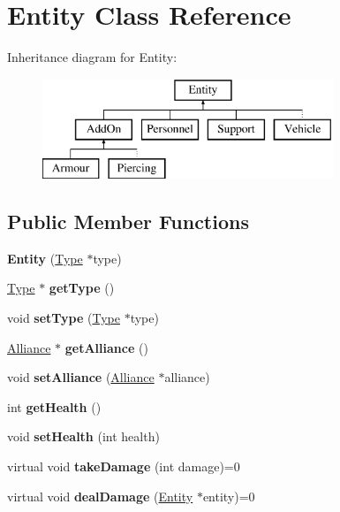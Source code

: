 \hypertarget{classEntity}{}\section{Entity Class Reference}
\label{classEntity}
Inheritance diagram for Entity\+:\begin{figure}[H]
\begin{center}
\leavevmode
\includegraphics[height=3.000000cm]{classEntity}
\end{center}
\end{figure}
\subsection*{Public Member Functions}
\begin{DoxyCompactItemize}
\item 
\mbox{\label{classEntity_aec265b299e5f6ba10ed4e38f2d206ad7}} 
{\bfseries Entity} (\hyperlink{classType}{Type} $\ast$type)
\item 
\mbox{\label{classEntity_a3a9c9e298bfc47b726a2d9ce44dd7464}} 
\hyperlink{classType}{Type} $\ast$ {\bfseries get\+Type} ()
\item 
\mbox{\label{classEntity_a5d04ce64c9ca214900422865e298e36c}} 
void {\bfseries set\+Type} (\hyperlink{classType}{Type} $\ast$type)
\item 
\mbox{\label{classEntity_aa101047a4bc312b697b65b4c3a39ffc5}} 
\hyperlink{classAlliance}{Alliance} $\ast$ {\bfseries get\+Alliance} ()
\item 
\mbox{\label{classEntity_af804dcaa600e770cf0e2b4537f6fba23}} 
void {\bfseries set\+Alliance} (\hyperlink{classAlliance}{Alliance} $\ast$alliance)
\item 
\mbox{\label{classEntity_a2b0140ae8c77c0e3654b070ee3c7fe57}} 
int {\bfseries get\+Health} ()
\item 
\mbox{\label{classEntity_a7dae281ff92be9bc98672cafe05c77ab}} 
void {\bfseries set\+Health} (int health)
\item 
\mbox{\label{classEntity_a9cc5a2246a5580ceed0f081c18211e53}} 
virtual void {\bfseries take\+Damage} (int damage)=0
\item 
\mbox{\label{classEntity_aff881f545fc88b2c328ff559a99c7fba}} 
virtual void {\bfseries deal\+Damage} (\hyperlink{classEntity}{Entity} $\ast$entity)=0
\end{DoxyCompactItemize}


